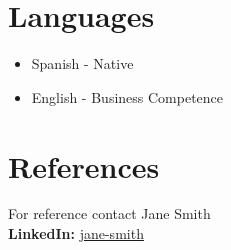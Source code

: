 \documentclass[a4paper,10pt]{article}
\begin{document}


\section*{ Languages}
\begin{itemize}[label=]
    \item Spanish - Native
    \item English - Business Competence
\end{itemize}

\section*{ References}
For reference contact Jane Smith\\ \textbf{ LinkedIn:} \href{https://www.linkedin.com/in/jane-smith/}{jane-smith}
\end{document}
